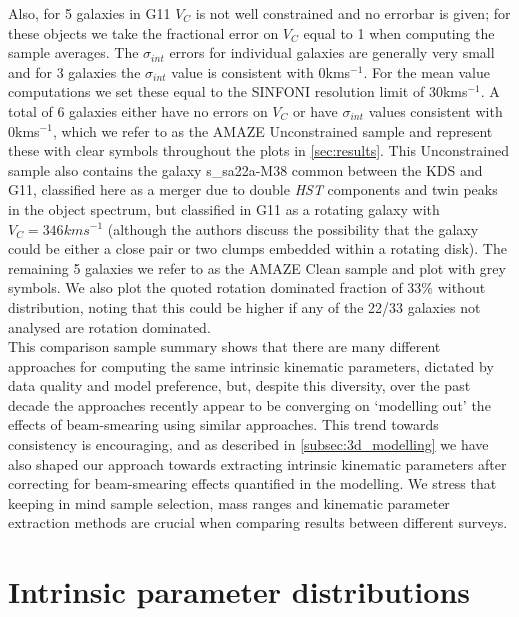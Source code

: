 \documentclass[fleqn,usenatbib]{mn2e}
\begin{document}
Also, for 5 galaxies in G11 $V_{C}$ is not well constrained and no errorbar is given; for these objects we take the fractional error on $V_{C}$ equal to 1 when computing the sample averages.
The $\sigma_{int}$ errors for individual galaxies are generally very small and for 3 galaxies the $\sigma_{int}$ value is consistent with 0kms$^{-1}$.
For the mean value computations we set these equal to the SINFONI resolution limit of 30kms$^{-1}$.
A total of 6 galaxies either have no errors on $V_{C}$ or have $\sigma_{int}$ values consistent with 0kms$^{-1}$, which we refer to as the AMAZE Unconstrained sample and represent these with clear symbols throughout the plots in \cref{sec:results}.
This Unconstrained sample also contains the galaxy s\_sa22a-M38 common between the KDS and G11, classified here as a merger due to double {\em HST} components and twin peaks in the object spectrum, but classified in G11 as a rotating galaxy with $V_{C} = 346kms^{-1}$ (although the authors discuss the possibility that the galaxy could be either a close pair or two clumps embedded within a rotating disk).
The remaining 5 galaxies we refer to as the AMAZE Clean sample and plot with grey symbols.
We also plot the quoted rotation dominated fraction of 33$\%$ without distribution, noting that this could be higher if any of the 22/33 galaxies not analysed are rotation dominated. \\
 
This comparison sample summary shows that there are many different approaches for computing the same intrinsic kinematic parameters, dictated by data quality and model preference, but, despite this diversity, over the past decade the approaches recently appear to be converging on `modelling out' the effects of beam-smearing using similar approaches.
This trend towards consistency is encouraging, and as described in \cref{subsec:3d_modelling} we have also shaped our approach towards extracting intrinsic kinematic parameters after correcting for beam-smearing effects quantified in the modelling.
We stress that keeping in mind sample selection, mass ranges and kinematic parameter extraction methods are crucial when comparing results between different surveys.

\section{Intrinsic parameter distributions}
\end{document}
